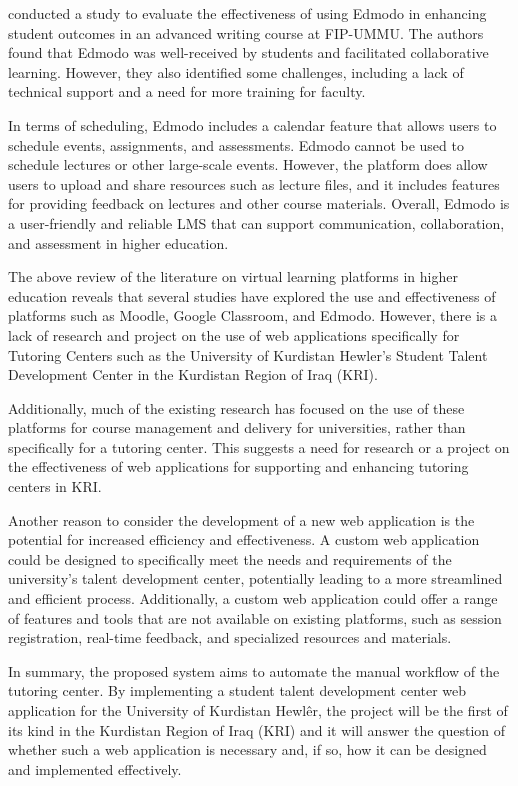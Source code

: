 \begin{justify}
\vspace{0.25cm}
\newendline \cite{gay2017effectiveness} conducted a study to evaluate the effectiveness of using Edmodo in enhancing student outcomes in an advanced writing course at FIP-UMMU. The authors found that Edmodo was well-received by students and facilitated collaborative learning. However, they also identified some challenges, including a lack of technical support and a need for more training for faculty.

\vspace{0.25cm}
\newendline In terms of scheduling, Edmodo includes a calendar feature that allows users to schedule events, assignments, and assessments. Edmodo cannot be used to schedule lectures or other large-scale events. However, the platform does allow users to upload and share resources such as lecture files, and it includes features for providing feedback on lectures and other course materials. Overall, Edmodo is a user-friendly and reliable LMS that can support communication, collaboration, and assessment in higher education.

\vspace{0.25cm}
\newendline The above review of the literature on virtual learning platforms in higher education reveals that several studies have explored the use and effectiveness of platforms such as Moodle, Google Classroom, and Edmodo. However, there is a lack of research and project on the use of web applications specifically for Tutoring Centers such as the University of Kurdistan Hewler’s Student Talent Development Center in the Kurdistan Region of Iraq (KRI).

\vspace{0.25cm}
\newendline Additionally, much of the existing research has focused on the use of these platforms for course management and delivery for universities, rather than specifically for a tutoring center. This suggests a need for research or a project on the effectiveness of web applications for supporting and enhancing tutoring centers in KRI.

\vspace{0.25cm}
\newendline Another reason to consider the development of a new web application is the potential for increased efficiency and effectiveness. A custom web application could be designed to specifically meet the needs and requirements of the university's talent development center, potentially leading to a more streamlined and efficient process. Additionally, a custom web application could offer a range of features and tools that are not available on existing platforms, such as session registration, real-time feedback, and specialized resources and materials.

\vspace{0.25cm}
\newendline In summary, the proposed system aims to automate the manual workflow of the tutoring center. By implementing a student talent development center web application for the University of Kurdistan Hewlêr, the project will be the first of its kind in the Kurdistan Region of Iraq (KRI) and it will answer the question of whether such a web application is necessary and, if so, how it can be designed and implemented effectively.

\end{justify}
\clearpage